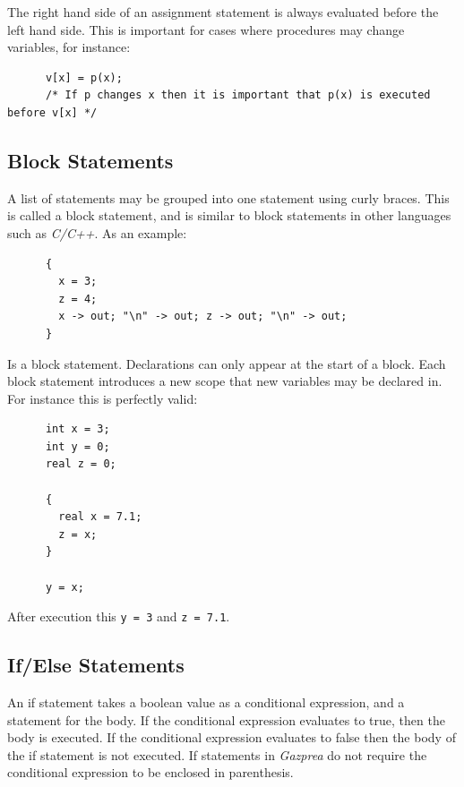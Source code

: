 \documentclass{article}
\begin{document}
    The right hand side of an assignment statement is always evaluated before the left hand side. This is important
    for cases where procedures may change variables, for instance:

    \begin{lstlisting}
      v[x] = p(x);
      /* If p changes x then it is important that p(x) is executed before v[x] */
    \end{lstlisting}

  \subsection{Block Statements}\label{sec:block}

    A list of statements may be grouped into one statement using curly braces. This is called a block statement, and
    is similar to block statements in other languages such as \textit{C/C++}. As an example:

    \begin{lstlisting}
      {
        x = 3;
        z = 4;
        x -> out; "\n" -> out; z -> out; "\n" -> out;
      }
    \end{lstlisting}

    Is a block statement. Declarations can only appear at the start of a block.  Each block statement introduces a
    new scope that new variables may be declared in. For instance this is perfectly valid:

    \begin{lstlisting}
      int x = 3;
      int y = 0;
      real z = 0;

      {
        real x = 7.1;
        z = x;
      }

      y = x;
    \end{lstlisting}

    After execution this \texttt{y = 3} and \texttt{z = 7.1}.


  \subsection{If/Else Statements}\label{sec:conditional}

    An if statement takes a boolean value as a conditional expression, and a statement for the body. If the
    conditional expression evaluates to true, then the body is executed. If the conditional expression evaluates to
    false then the body of the if statement is not executed. If statements in \textit{Gazprea} do not require the
    conditional expression to be enclosed in parenthesis.
\end{document}
